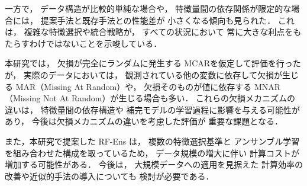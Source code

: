 一方で，
データ構造が比較的単純な場合や，
特徴量間の依存関係が限定的な場合には，
提案手法と既存手法との性能差が
小さくなる傾向も見られた．
これは，
複雑な特徴選択や統合戦略が，
すべての状況において
常に大きな利点をもたらすわけではないことを示唆している．

本研究では，
欠損が完全にランダムに発生する
MCARを仮定して評価を行ったが，
実際のデータにおいては，
観測されている他の変数に依存して欠損が生じる
MAR（Missing At Random）や，
欠損そのものが値に依存する
MNAR（Missing Not At Random）が生じる場合も多い．
これらの欠損メカニズムの違いは，
特徴量間の依存構造や
補完モデルの学習過程に影響を与える可能性があり，
今後は欠損メカニズムの違いを考慮した評価が
重要な課題となる．

また，本研究で提案した RF-Ens は，
複数の特徴選択基準と
アンサンブル学習を組み合わせた構成を取っているため，
データ規模の増大に伴い
計算コストが増加する可能性がある．
今後は，
大規模データへの適用を見据えた
計算効率の改善や近似的手法の導入についても
検討が必要である．
